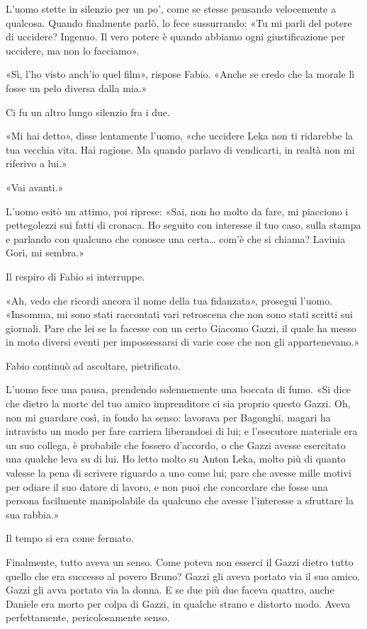 L'uomo stette in silenzio per un po', come se stesse pensando
velocemente a qualcosa. Quando finalmente parlò, lo fece sussurrando:
«Tu mi parli del potere di uccidere? Ingenuo. Il vero potere è quando
abbiamo ogni giustificazione per uccidere, ma non lo facciamo».

«Sì, l'ho visto anch'io quel film», rispose Fabio. «Anche se credo che
la morale lì fosse un pelo diversa dalla mia.»

Ci fu un altro lungo silenzio fra i due.

«Mi hai detto», disse lentamente l'uomo, «che uccidere Leka non ti
ridarebbe la tua vecchia vita. Hai ragione. Ma quando parlavo di
vendicarti, in realtà non mi riferivo a lui.»

«Vai avanti.»

L'uomo esitò un attimo, poi riprese: «Sai, non ho molto da fare, mi
piacciono i pettegolezzi sui fatti di cronaca. Ho seguito con interesse
il tuo caso, sulla stampa e parlando con qualcuno che conosce una
certa\ldots{} com'è che si chiama? Lavinia Gori, mi sembra.»

Il respiro di Fabio si interruppe.

«Ah, vedo che ricordi ancora il nome della tua fidanzata», proseguì
l'uomo. «Insomma, mi sono stati raccontati vari retroscena che non sono
stati scritti sui giornali. Pare che lei se la facesse con un certo
Giacomo Gazzi, il quale ha messo in moto diversi eventi per
impossessarsi di varie cose che non gli appartenevano.»

Fabio continuò ad ascoltare, pietrificato.

L'uomo fece una pausa, prendendo solennemente una boccata di fumo. «Si
dice che dietro la morte del tuo amico imprenditore ci sia proprio
questo Gazzi. Oh, non mi guardare così, in fondo ha senso: lavorava per
Bagonghi, magari ha intravisto un modo per fare carriera liberandosi di
lui; e l'esecutore materiale era un suo collega, è probabile che fossero
d'accordo, o che Gazzi avesse esercitato una qualche leva su di lui. Ho
letto molto su Anton Leka, molto più di quanto valesse la pena di
scrivere riguardo a uno come lui; pare che avesse mille motivi per
odiare il suo datore di lavoro, e non puoi che concordare che fosse una
persona facilmente manipolabile da qualcuno che avesse l'interesse a
sfruttare la sua rabbia.»

Il tempo si era come fermato.

Finalmente, tutto aveva un senso. Come poteva non esserci il Gazzi
dietro tutto quello che era successo al povero Bruno? Gazzi gli aveva
portato via il suo amico. Gazzi gli avva portato via la donna. E se due
più due faceva quattro, anche Daniele era morto per colpa di Gazzi, in
qualche strano e distorto modo. Aveva perfettamente, pericolosamente
senso.


